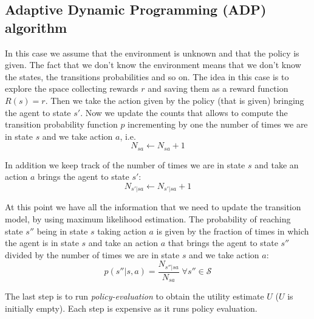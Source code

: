 \subsection{Adaptive Dynamic Programming (ADP) algorithm}
In this case we assume that the environment is unknown and that the policy is
given. The fact that we don't know the environment means that we don't know the states,
the transitions probabilities and so on. The idea in this case is to explore the
space collecting rewards $r$ and saving them as a reward function $R(s)=r$. Then
we take the action given by the policy (that is given) bringing the agent to
state $s'$. Now we update the counts that allows to compute the transition probability
function $p$ incrementing by one the number of times we are in state $s$ and we take
action $a$, i.e.
\begin{equation}
	N_{sa}\leftarrow N_{sa}+1
\end{equation}

In addition we keep track of the number of times we are in state $s$ and take an
action $a$ brings the agent to state $s'$:
\begin{equation}
	N_{s'|sa}\leftarrow N_{s'|sa}+1
\end{equation}

At this point we have all the information that we need to update the transition
model, by using maximum likelihood estimation. The probability of reaching state
$s''$ being in state $s$ taking action $a$ is given by the fraction of times in
which the agent is in state $s$ and take an action $a$ that brings the agent to
state $s''$ divided by the number of times we are in state $s$ and we take
action $a$:
\begin{equation}
	p(s''|s,a) = \frac{N_{s''|sa}}{N_{sa}}\; \forall s'' \in \mathcal{S}
\end{equation}

The last step is to run \textit{policy-evaluation} to obtain the utility estimate
$U$ ($U$ is initially empty). Each step is expensive as it runs policy
evaluation.

